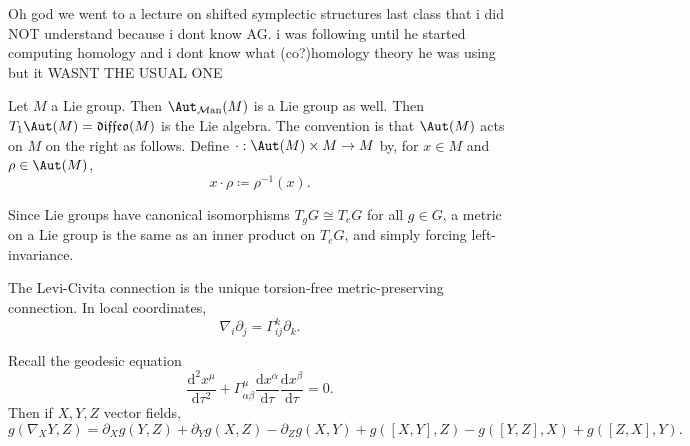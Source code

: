 
Oh god we went to a lecture on shifted symplectic structures last class that i did NOT understand because i dont know AG. i was following until he started computing homology and i dont know what (co?)homology theory he was using but it WASNT THE USUAL ONE

Let $M$ a Lie group. Then $\Aut_{\mathcal{M} \mathrm{an} } (M) $ is a Lie group as well. Then $T_1\Aut(M) =\mathfrak{diffeo} (M)$ is the Lie algebra. The convention is that $\Aut(M) $ acts on $M$ on the right as follows. Define $\cdot : \Aut(M) \times M \to M$ by, for $x\in M$ and $\rho \in \Aut(M) $,
\[
	x\cdot \rho \coloneqq \rho ^{-1} (x)
.\]

\begin{remark}
	Since Lie groups have canonical isomorphisms $T_gG \cong T_eG$ for all $g\in G$, a metric on a Lie group is the same as an inner product on $T_eG$, and simply forcing left-invariance.
\end{remark}
\begin{definition}\label{1.2.7}
	The Levi-Civita connection is the unique torsion-free metric-preserving connection. In local coordinates,
	\[
		\nabla _i \partial _j=\Gamma _{ij} ^k \partial _k
	.\]
\end{definition}

Recall the geodesic equation
\[
	\frac{\mathrm{d}^2x^\mu }{\mathrm{d}\tau ^2} +\Gamma _{\alpha \beta } ^\mu \frac{\mathrm{d}x^\alpha }{\mathrm{d}\tau } \frac{\mathrm{d}x^\beta }{\mathrm{d}\tau } =0
.\]
Then if $X,Y,Z$ vector fields,
\[
	g(\nabla _XY,Z)=\partial _Xg(Y,Z)+\partial _Yg(X,Z)-\partial _Zg(X,Y)+g([X,Y],Z)-g([Y,Z],X)+g([Z,X],Y)
.\]

